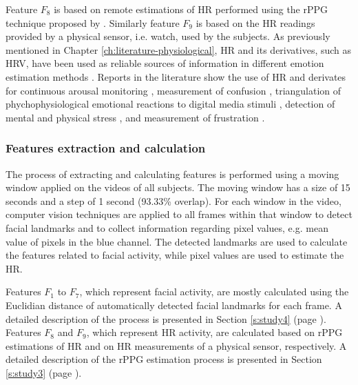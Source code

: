 Feature $F_8$ is based on remote estimations of HR performed using the rPPG technique proposed by \textcite{poh2011advancements}. Similarly feature $F_9$ is based on the HR readings provided by a physical sensor, i.e. watch, used by the subjects. As previously mentioned in Chapter \ref{ch:literature-physiological}, HR and its derivatives, such as HRV, have been used as reliable sources of information in different emotion estimation methods \parencite{kukolja2014comparative}. Reports in the literature show the use of HR and derivates for continuous arousal monitoring \parencite{grundlehner2009design}, measurement of confusion \parencite{xiao2015towards}, triangulation of phychophysiological emotional reactions to digital media stimuli \parencite{nogueira2015annotation}, detection of mental and physical stress \parencite{vandeput2009heart,garde2002effects}, and measurement of frustration \parencite{rodriguez2015vr}.

\subsubsection{Features extraction and calculation}

The process of extracting and calculating features is performed using a moving window applied on the videos of all subjects. The moving window has a size of 15 seconds and a step of 1 second (93.33\% overlap). For each window in the video, computer vision techniques are applied to all frames within that window to detect facial landmarks and to collect information regarding pixel values, e.g. mean value of pixels in the blue channel. The detected landmarks are used to calculate the features related to facial activity, while pixel values are used to estimate the HR.

Features $F_1$ to $F_7$, which represent facial activity, are mostly calculated using the Euclidian distance of automatically detected facial landmarks for each frame. A detailed description of the process is presented in Section \ref{s:study4} (page \pageref{s:study4}). Features $F_8$ and $F_9$, which represent HR activity, are calculated based on rPPG estimations of HR and on HR measurements of a physical sensor, respectively. A detailed description of the rPPG estimation process is presented in Section \ref{s:study3} (page \pageref{s:study3}).

